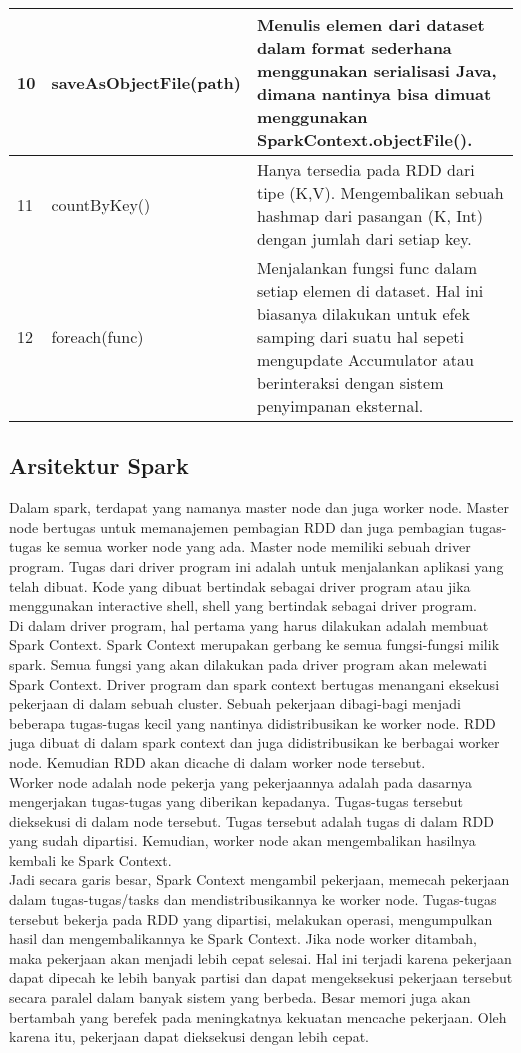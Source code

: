 \begin{tabular}{|p{}|p{}|p{}|}
\hline 
10 & saveAsObjectFile(path) & Menulis elemen dari dataset dalam format sederhana menggunakan serialisasi Java, dimana nantinya bisa dimuat menggunakan SparkContext.objectFile().\\ 
\hline 
11 & countByKey() & Hanya tersedia pada RDD dari tipe (K,V). Mengembalikan sebuah hashmap dari pasangan (K, Int) dengan jumlah dari setiap key.\\ 
\hline 
12 & foreach(func) & Menjalankan fungsi func dalam setiap elemen di dataset. Hal ini biasanya dilakukan untuk efek samping dari suatu hal sepeti mengupdate Accumulator atau berinteraksi dengan sistem penyimpanan eksternal.\\ 
\hline 
\end{tabular} 

\subsection{Arsitektur Spark}
Dalam spark, terdapat yang namanya master node dan juga worker node. Master node bertugas untuk memanajemen pembagian RDD dan juga pembagian tugas-tugas ke semua worker node yang ada. Master node memiliki sebuah driver program. Tugas dari driver program ini adalah untuk menjalankan aplikasi yang telah dibuat. Kode yang dibuat bertindak sebagai driver program atau jika menggunakan interactive shell, shell yang bertindak sebagai driver program. \\
Di dalam driver program, hal pertama yang harus dilakukan adalah membuat Spark Context. Spark Context merupakan gerbang ke semua fungsi-fungsi milik spark. Semua fungsi yang akan dilakukan pada driver program akan melewati Spark Context. Driver program dan spark context bertugas menangani eksekusi pekerjaan di dalam sebuah cluster. Sebuah pekerjaan dibagi-bagi menjadi beberapa tugas-tugas kecil yang nantinya didistribusikan ke worker node. RDD juga dibuat di dalam spark context dan juga didistribusikan ke berbagai worker node. Kemudian RDD akan dicache di dalam worker node tersebut.\\
Worker node adalah node pekerja yang pekerjaannya adalah pada dasarnya mengerjakan tugas-tugas yang diberikan kepadanya. Tugas-tugas tersebut dieksekusi di dalam node tersebut. Tugas tersebut adalah tugas di dalam RDD yang sudah dipartisi. Kemudian, worker node  akan mengembalikan hasilnya kembali ke Spark Context.\\
Jadi secara garis besar, Spark Context mengambil pekerjaan, memecah pekerjaan dalam tugas-tugas/tasks dan mendistribusikannya ke worker node. Tugas-tugas tersebut bekerja pada RDD yang dipartisi, melakukan operasi, mengumpulkan hasil dan mengembalikannya ke Spark Context. 
Jika node worker ditambah, maka pekerjaan akan menjadi lebih cepat selesai. Hal ini terjadi karena pekerjaan dapat dipecah ke lebih banyak partisi dan dapat mengeksekusi pekerjaan tersebut secara paralel dalam banyak sistem yang berbeda. Besar memori juga akan bertambah yang berefek pada meningkatnya kekuatan mencache pekerjaan.
Oleh karena itu, pekerjaan dapat dieksekusi dengan lebih cepat.

